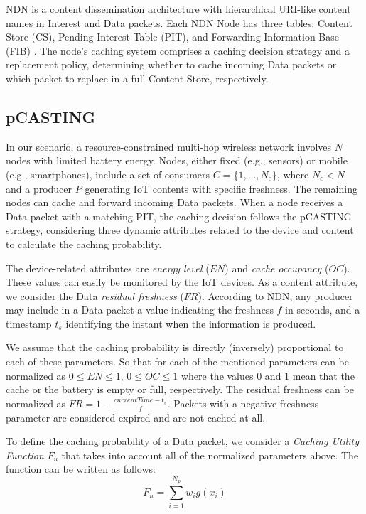 \documentclass[conference]{IEEEtran}
\begin{document}
NDN is a content dissemination architecture with hierarchical URI-like content names in Interest and Data packets. 
Each NDN Node has three tables: Content Store (CS), Pending Interest Table (PIT), and Forwarding Information Base (FIB) \cite{b9}. 
The node's caching system comprises a caching decision strategy and a replacement policy, determining whether to cache incoming Data 
packets or which packet to replace in a full Content Store, respectively.

\subsection{pCASTING}

In our scenario, a resource-constrained multi-hop wireless network involves $N$ nodes with limited battery energy. Nodes, either fixed 
(e.g., sensors) or mobile (e.g., smartphones), include a set of consumers $C = \{1, ..., N_c\}$, where $N_c < N$ and a producer $P$ generating 
IoT contents with specific freshness. The remaining nodes can cache and forward incoming Data packets. When a node receives a Data packet 
with a matching PIT, the caching decision follows the pCASTING strategy, considering three dynamic attributes related to the device and 
content to calculate the caching probability.

The device-related attributes are \textit{energy level} ($EN$) and \textit{cache occupancy} ($OC$). These values can easily be monitored by the
IoT devices. As a content attribute, we consider the Data \textit{residual freshness} ($FR$). According to NDN, any producer may include in a Data packet a value indicating the freshness $f$ in seconds,
and a timestamp $t_s$ identifying the instant when the information is produced.

We assume that the caching probability is directly (inversely) proportional to each of these parameters. So that for each of the mentioned parameters can be
normalized as $0 \leq EN \leq 1$, $0 \leq OC \leq 1$ where the values $0$ and $1$ mean that the cache or the battery is empty or full, respectively.
The residual freshness can be normalized as $ FR = 1 - \frac{currentTime - t_s}{f}$.
Packets with a negative freshness parameter are considered expired and are not cached at all.

To define the caching probability of a Data packet, we consider a \textit{Caching Utility Function} $F_u$ that takes into account
all of the normalized parameters above. The function can be written as follows:
$$F_u = \sum_{i = 1}^{N_p} w_i g(x_i)$$
\end{document}
